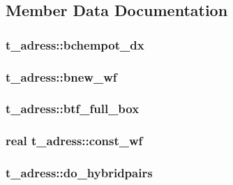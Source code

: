 \subsection{\-Member \-Data \-Documentation}
\hypertarget{structt__adress_a06568b17d279700c6dac6e02280dffee}{
\subsubsection[{bchempot\-\_\-dx}]{ {\bf t\-\_\-adress\-::bchempot\-\_\-dx}}}\label{structt__adress_a06568b17d279700c6dac6e02280dffee}
\hypertarget{structt__adress_ae0e3f0fc54b82d61ced43f8e0a932124}{
\subsubsection[{bnew\-\_\-wf}]{ {\bf t\-\_\-adress\-::bnew\-\_\-wf}}}\label{structt__adress_ae0e3f0fc54b82d61ced43f8e0a932124}
\hypertarget{structt__adress_ae6b074960566513edda0ffe7dd468d7d}{
\subsubsection[{btf\-\_\-full\-\_\-box}]{ {\bf t\-\_\-adress\-::btf\-\_\-full\-\_\-box}}}\label{structt__adress_ae6b074960566513edda0ffe7dd468d7d}
\hypertarget{structt__adress_afaa5b7a7f39117dc73e0abd5a04eb276}{
\subsubsection[{const\-\_\-wf}]{\setlength{\rightskip}{0pt plus 5cm}real {\bf t\-\_\-adress\-::const\-\_\-wf}}}\label{structt__adress_afaa5b7a7f39117dc73e0abd5a04eb276}
\hypertarget{structt__adress_a4314a68d343950b11412732365be1184}{
\subsubsection[{do\-\_\-hybridpairs}]{ {\bf t\-\_\-adress\-::do\-\_\-hybridpairs}}}\label{structt__adress_a4314a68d343950b11412732365be1184}
